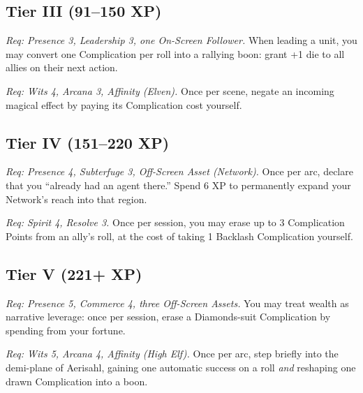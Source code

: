 \documentclass[12pt]{book}
\begin{document}
\subsection*{Tier III (91--150 XP)}
\begin{description}[leftmargin=2cm]
  \item[Oath-Bound Captain]  
  \emph{Req: Presence 3, Leadership 3, one On-Screen Follower.}  
  When leading a unit, you may convert one Complication per roll into a rallying boon: grant +1 die to all allies on their next action.  

  \item[Echo-Killer]  
  \emph{Req: Wits 4, Arcana 3, Affinity (Elven).}  
  Once per scene, negate an incoming magical effect by paying its Complication cost yourself.  
\end{description}

\subsection*{Tier IV (151--220 XP)}
\begin{description}[leftmargin=2cm]
  \item[Shadow Broker]  
  \emph{Req: Presence 4, Subterfuge 3, Off-Screen Asset (Network).}  
  Once per arc, declare that you ``already had an agent there.''  
  Spend 6 XP to permanently expand your Network’s reach into that region.  

  \item[Spirit-Shield]  
  \emph{Req: Spirit 4, Resolve 3.}  
  Once per session, you may erase up to 3 Complication Points from an ally’s roll, at the cost of taking 1 Backlash Complication yourself.  
\end{description}

\subsection*{Tier V (221+ XP)}
\begin{description}[leftmargin=2cm]
  \item[Master of Coin]  
  \emph{Req: Presence 5, Commerce 4, three Off-Screen Assets.}  
  You may treat wealth as narrative leverage: once per session, erase a Diamonds-suit Complication by spending from your fortune.  

  \item[Echo-Walker]  
  \emph{Req: Wits 5, Arcana 4, Affinity (High Elf).}  
  Once per arc, step briefly into the demi-plane of Aerisahl, gaining one automatic success on a roll \emph{and} reshaping one drawn Complication into a boon.  
\end{description}
\end{document}

